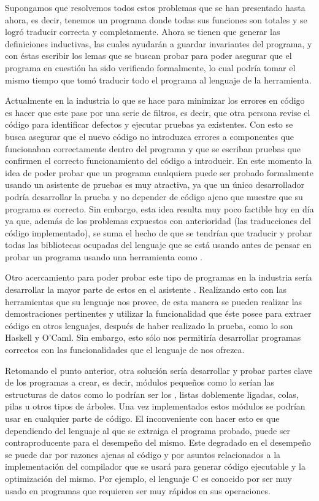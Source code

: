 Supongamos que resolvemos todos estos problemas que se han presentado hasta ahora, es decir,
tenemos un programa donde todas sus funciones son totales y se logr\'o traducir correcta y
completamente. Ahora se tienen que generar las definiciones inductivas, las 
cuales ayudar\'an a
guardar invariantes del programa, y con \'estas escribir los lemas que se buscan 
probar para poder
asegurar que el programa en cuesti\'on ha sido verificado formalmente, lo cual 
podría tomar el mismo tiempo que tom\'o
traducir todo el programa al lenguaje de la herramienta.

Actualmente en la industria lo que se hace para minimizar los errores en 
c\'odigo es hacer que este
pase por una serie de filtros, es decir, que otra persona revise el c\'odigo 
para identificar defectos y ejecutar pruebas ya existentes. Con esto se busca 
asegurar que el nuevo c\'odigo no
introduzca errores a componentes que funcionaban correctamente dentro del programa y que se escriban 
pruebas que confirmen el correcto funcionamiento del c\'odigo a introducir. En este momento la idea 
de poder probar que un programa cualquiera puede ser probado formalmente usando un asistente de 
pruebas es muy atractiva, ya que un \'unico desarrollador podr\'ia desarrollar la prueba y no 
depender de código ajeno que muestre que su programa es correcto. Sin embargo, esta idea resulta muy 
poco factible hoy en día ya que, además de los problemas expuestos con anterioridad (las 
traducciones del c\'odigo implementado), se suma el hecho de que se tendrían que traducir y probar 
todas las bibliotecas ocupadas del lenguaje que se est\'a usando antes de pensar en probar un 
programa usando una herramienta como {\coq}.

Otro acercamiento para poder probar este tipo de programas en la industria ser\'ia desarrollar la 
mayor parte de estos en el asistente {\coq}. Realizando esto con las herramientas que su lenguaje 
nos provee, de esta manera se pueden realizar las demostraciones pertinentes y utilizar la 
funcionalidad que \'este posee para extraer c\'odigo en otros lenguajes, después de haber realizado la 
prueba, como lo son Haskell y O'Caml. Sin embargo, esto s\'olo nos permitiría desarrollar programas 
correctos con las funcionalidades que el lenguaje de {\coq} nos ofrezca.

Retomando el punto anterior, otra soluci\'on ser\'ia desarrollar y probar 
partes clave de los 
programas a crear, es decir, m\'odulos pequeños como lo ser\'ian las estructuras de datos como 
lo podrían ser los {\arns}, listas doblemente ligadas, colas, pilas u otros tipos de \'arboles. Una 
vez implementados estos m\'odulos se podrían usar en cualquier parte de 
c\'odigo. El inconveniente con 
hacer esto es que dependiendo del lenguaje al que se extraiga el programa probado, puede ser 
contraproducente para el desempeño del mismo. Este degradado en el desempeño se puede dar por 
razones ajenas al c\'odigo y por asuntos relacionados a la implementaci\'on del compilador que 
se usar\'a para generar c\'odigo ejecutable y la optimizaci\'on del mismo. Por ejemplo, el 
lenguaje C es conocido por ser muy usado en programas que requieren ser muy rápidos en sus 
operaciones.

